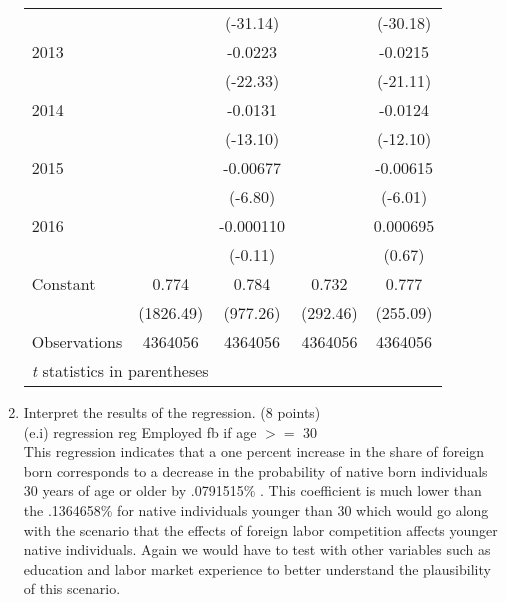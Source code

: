 \documentclass{article}
\begin{document}
\begin{enumerate}[label=\alph*]
\begin{table}[htbp]
\begin{tabular}{l*{4}{c}}
                    &            &    (-31.14)&            &    (-30.18)\\
[1em]
2013                &            &     -0.0223&            &     -0.0215\\
                    &            &    (-22.33)&            &    (-21.11)\\
[1em]
2014                &            &     -0.0131&            &     -0.0124\\
                    &            &    (-13.10)&            &    (-12.10)\\
[1em]
2015                &            &    -0.00677&            &    -0.00615\\
                    &            &     (-6.80)&            &     (-6.01)\\
[1em]
2016                &            &   -0.000110&            &    0.000695\\
                    &            &     (-0.11)&            &      (0.67)\\
[1em]
Constant            &       0.774&       0.784&       0.732&       0.777\\
                    &   (1826.49)&    (977.26)&    (292.46)&    (255.09)\\
\hline
Observations        &     4364056&     4364056&     4364056&     4364056\\
\hline\hline
\multicolumn{5}{l}{\footnotesize \textit{t} statistics in parentheses}\\
\end{tabular}
\end{table}

\item Interpret the results of the regression. (8 points)\\

(e.i) regression reg Employed fb if age $>=$ 30\\

This regression indicates that a one percent increase in the share of foreign born corresponds to a decrease in the probability of native born individuals 30 years of age or older by .0791515\% . This coefficient is much lower than the .1364658\% for native individuals younger than 30 which would go along with the scenario that the effects of foreign labor competition affects younger native individuals. Again we would have to test with other variables such as education and labor market experience to better understand the plausibility of this scenario.


\end{enumerate}
\end{document}
